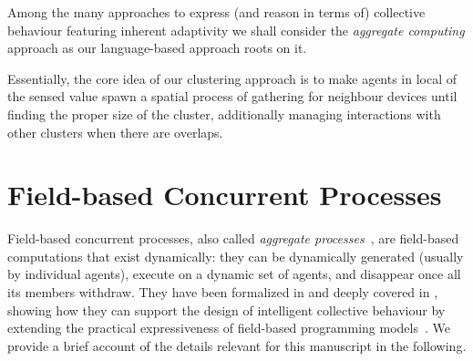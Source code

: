 Among the many approaches to express (and reason in terms of) collective behaviour featuring inherent adaptivity we shall consider the \emph{aggregate computing} approach as our language-based approach roots on it.
%
%
%
%
%

Essentially, the core idea of our clustering approach is to make agents
 in local  of the sensed value  spawn a spatial process of gathering for neighbour devices until finding the proper size of the cluster,
 additionally managing interactions with other clusters when there are overlaps.
%

\label{s:background}

\section{Field-based Concurrent Processes}
Field-based concurrent processes, also called \emph{aggregate processes}~\cite{DBLP:conf/coordination/CasadeiVAPD19,DBLP:journals/eaai/CasadeiVAPD21},
 are field-based computations
 that exist dynamically:
 they can be dynamically generated (usually by individual agents),
 execute on a dynamic set of agents,
 and disappear once all its members withdraw.
%
They have been formalized in \cite{DBLP:conf/coordination/CasadeiVAPD19}
 and deeply covered in \cite{DBLP:journals/eaai/CasadeiVAPD21},
 showing how they can support the design of intelligent collective behaviour by extending the practical expressiveness of field-based programming models~\cite{DBLP:journals/jlap/ViroliBDACP19}.
%
We provide a brief account of the details relevant for this manuscript in the following.

